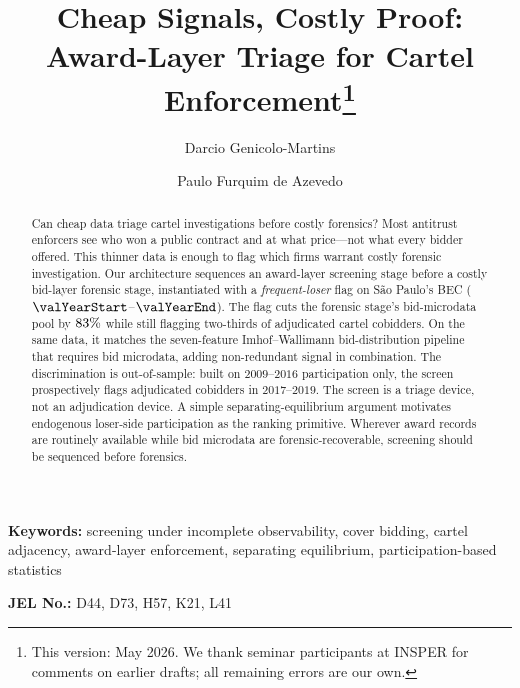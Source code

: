 \begin{frontmatter}

\title{Cheap Signals, Costly Proof: Award-Layer Triage for Cartel Enforcement\texorpdfstring{\footnote{This version: May 2026. We thank seminar participants at INSPER for comments on earlier drafts; all remaining errors are our own.}}{}}

\author[insper]{Darcio Genicolo-Martins}
\author[insper]{Paulo Furquim de Azevedo}

\begin{abstract}
Can cheap data triage cartel investigations before costly
forensics? Most antitrust enforcers see who won a public
contract and at what price---not what every bidder offered.
This thinner data is enough to flag which firms warrant costly
forensic investigation. Our architecture sequences an
award-layer screening stage before a costly bid-layer forensic
stage, instantiated with a \emph{frequent-loser} flag on
São Paulo's BEC ($\valYearStart$--$\valYearEnd$). The flag
cuts the forensic stage's bid-microdata pool by
$83\%$ while still flagging two-thirds
of adjudicated cartel cobidders. On the same data, it matches
the seven-feature Imhof--Wallimann bid-distribution pipeline
that requires bid microdata, adding non-redundant signal in
combination. The discrimination is out-of-sample: built on
$2009$--$2016$ participation only, the screen prospectively
flags adjudicated cobidders in $2017$--$2019$. The screen is
a triage device, not an adjudication device. A simple separating-equilibrium argument
motivates endogenous loser-side participation as the ranking
primitive. Wherever award records are routinely available while
bid microdata are forensic-recoverable, screening should be
sequenced before forensics.
\end{abstract}

\end{frontmatter}

\noindent\textbf{Keywords:} screening under incomplete observability, cover bidding, cartel adjacency, award-layer enforcement, separating equilibrium, participation-based statistics

\noindent\textbf{JEL No.:} D44, D73, H57, K21, L41

\bigskip
